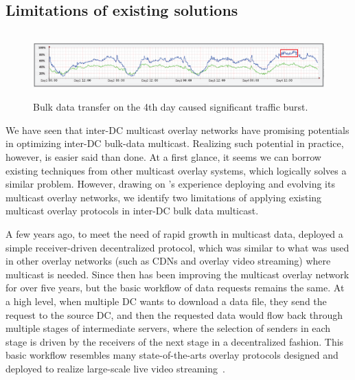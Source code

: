 \subsection{Limitations of existing solutions}
\label{subsec:motivation:baseline}

\begin{figure}[t]
        \center
        \includegraphics[height=25mm,width=150mm]{images/nj02-M2A_0212-0216.eps}
        \caption{Bulk data transfer on the 4th day caused significant traffic burst.
        }
        \label{fig:lesson2}
\end{figure}

We have seen that inter-DC multicast overlay networks have
promising potentials in optimizing inter-DC bulk-data multicast.
Realizing such potential in practice, however,
is easier said than done.
At a first glance, it seems we can borrow existing techniques
from other multicast overlay systems, which logically solves a
similar problem.
However, drawing on \company's experience deploying and evolving
its multicast overlay networks, we identify two limitations of
applying existing multicast overlay protocols in inter-DC bulk
data multicast.

A few years ago, to meet the need of rapid growth in multicast
data, \company deployed a simple
receiver-driven decentralized protocol, which
was similar to what was used in other overlay networks
(such as CDNs and overlay video streaming)
where multicast is needed.
Since then \company has been improving the multicast overlay
network for over five years, but the basic workflow of
data requests remains the same.
At a high level, when multiple DC wants to download a data
file, they send the request to the source DC, and then the
requested data would flow back through multiple stages of
intermediate servers, where the selection of senders in each stage
is driven by the receivers of the next stage in a decentralized
fashion.
This basic workflow resembles many state-of-the-arts overlay
protocols designed and deployed to realize large-scale live video
streaming~\cite{??,??}.

